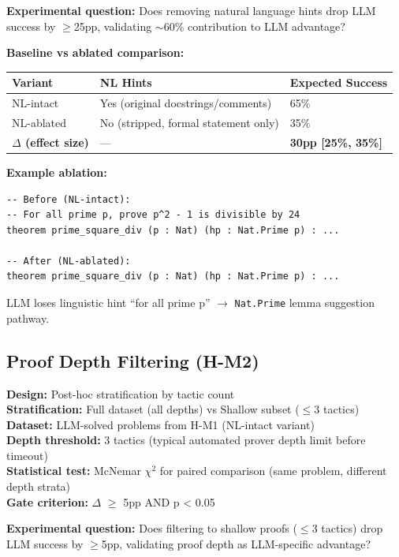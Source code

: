 \textbf{Experimental question:} Does removing natural language hints drop LLM success by $\geq$25pp, validating $\sim$60\% contribution to LLM advantage?

\textbf{Baseline vs ablated comparison:}

\begin{table}[h]
\centering
\small
\begin{tabular}{lll}
\toprule
\textbf{Variant} & \textbf{NL Hints} & \textbf{Expected Success} \\
\midrule
NL-intact & Yes (original docstrings/comments) & 65\% \\
NL-ablated & No (stripped, formal statement only) & 35\% \\
\textbf{$\Delta$ (effect size)} & --- & \textbf{30pp [25\%, 35\%]} \\
\bottomrule
\end{tabular}
\end{table}

\textbf{Example ablation:}
\begin{verbatim}
-- Before (NL-intact):
-- For all prime p, prove p^2 - 1 is divisible by 24
theorem prime_square_div (p : Nat) (hp : Nat.Prime p) : ...

-- After (NL-ablated):
theorem prime_square_div (p : Nat) (hp : Nat.Prime p) : ...
\end{verbatim}

LLM loses linguistic hint ``for all prime p'' $\rightarrow$ \texttt{Nat.Prime} lemma suggestion pathway.

\subsection{Proof Depth Filtering (H-M2)}

\textbf{Design:} Post-hoc stratification by tactic count \\
\textbf{Stratification:} Full dataset (all depths) vs Shallow subset ($\leq$3 tactics) \\
\textbf{Dataset:} LLM-solved problems from H-M1 (NL-intact variant) \\
\textbf{Depth threshold:} 3 tactics (typical automated prover depth limit before timeout) \\
\textbf{Statistical test:} McNemar $\chi^2$ for paired comparison (same problem, different depth strata) \\
\textbf{Gate criterion:} $\Delta$ $\geq$ 5pp AND p < 0.05

\textbf{Experimental question:} Does filtering to shallow proofs ($\leq$3 tactics) drop LLM success by $\geq$5pp, validating proof depth as LLM-specific advantage?

